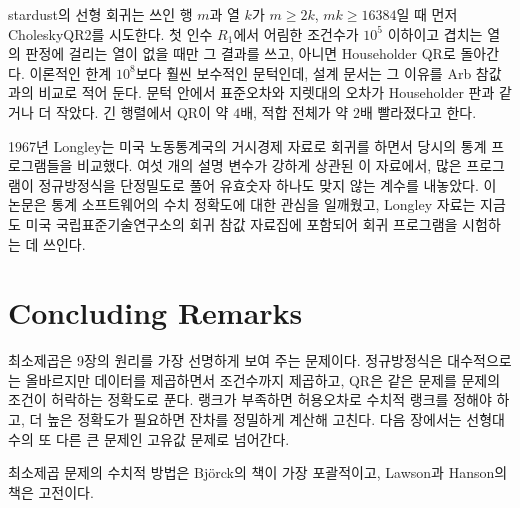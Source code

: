 \begin{instardust}
stardust의 선형 회귀는 쓰인 행 $m$과 열 $k$가 $m\ge2k$, $mk\ge16384$일 때 먼저 CholeskyQR2를 시도한다. 첫 인수 $R_1$에서 어림한 조건수가 $10^5$ 이하이고 겹치는 열의 판정에 걸리는 열이 없을 때만 그 결과를 쓰고, 아니면 Householder QR로 돌아간다. 이론적인 한계 $10^8$보다 훨씬 보수적인 문턱인데, 설계 문서는 그 이유를 Arb 참값과의 비교로 적어 둔다. 문턱 안에서 표준오차와 지렛대의 오차가 Householder 판과 같거나 더 작았다. 긴 행렬에서 QR이 약 $4$배, 적합 전체가 약 $2$배 빨라졌다고 한다.
\end{instardust}

\begin{aside}[Longley의 경고]
1967년 Longley는 미국 노동통계국의 거시경제 자료로 회귀를 하면서 당시의 통계 프로그램들을 비교했다. 여섯 개의 설명 변수가 강하게 상관된 이 자료에서, 많은 프로그램이 정규방정식을 단정밀도로 풀어 유효숫자 하나도 맞지 않는 계수를 내놓았다\cite{longley1967}. 이 논문은 통계 소프트웨어의 수치 정확도에 대한 관심을 일깨웠고, Longley 자료는 지금도 미국 국립표준기술연구소의 회귀 참값 자료집에 포함되어 회귀 프로그램을 시험하는 데 쓰인다\cite{nist-strd}.
\end{aside}

\section{Concluding Remarks}

최소제곱은 9장의 원리를 가장 선명하게 보여 주는 문제이다. 정규방정식은 대수적으로는 올바르지만 데이터를 제곱하면서 조건수까지 제곱하고, QR은 같은 문제를 문제의 조건이 허락하는 정확도로 푼다. 랭크가 부족하면 허용오차로 수치적 랭크를 정해야 하고, 더 높은 정확도가 필요하면 잔차를 정밀하게 계산해 고친다. 다음 장에서는 선형대수의 또 다른 큰 문제인 고유값 문제로 넘어간다.

최소제곱 문제의 수치적 방법은 Björck의 책\cite{bjorck1996}이 가장 포괄적이고, Lawson과 Hanson의 책\cite{lawson1995}은 고전이다.

\chapterreferences
